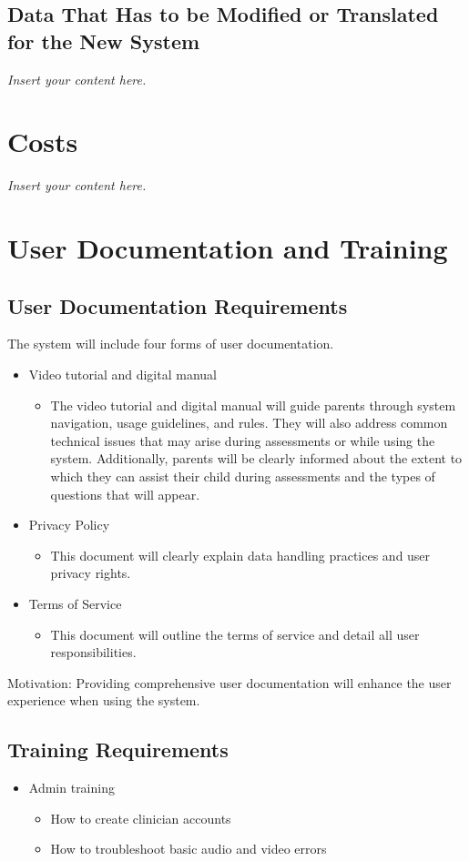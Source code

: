 \documentclass[12pt]{article}
\newcommand{\lips}{\textit{Insert your content here.}}
\begin{document}
\subsection{Data That Has to be Modified or Translated for the New System}
\lips

\section{Costs}
\lips
\section{User Documentation and Training}
\subsection{User Documentation Requirements}
\hspace{2em}The system will include four forms of user documentation. 
\begin{itemize}
  \item Video tutorial and digital manual
  \begin{itemize}
    \item The video tutorial and digital manual will guide parents through system navigation, usage guidelines, 
    and rules. They will also address common technical issues that may arise during assessments or 
    while using the system. Additionally, parents will be clearly informed about the extent to 
    which they can assist their child during assessments and the types of questions that will appear.
  \end{itemize}
  \item Privacy Policy
  \begin{itemize}
    \item This document will clearly explain data handling practices and user privacy rights.
  \end{itemize}
  \item Terms of Service
  \begin{itemize}
    \item This document will outline the terms of service and detail all user responsibilities.
  \end{itemize}
\end{itemize}

Motivation: Providing comprehensive user documentation will enhance the user experience when using the system.

\subsection{Training Requirements}
\begin{itemize}
  \item Admin training
  \begin{itemize}
    \item How to create clinician accounts
    \item How to troubleshoot basic audio and video errors
  \end{itemize}
\end{itemize}
\end{document}
